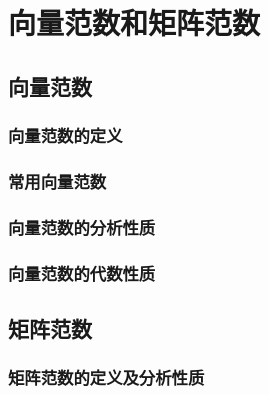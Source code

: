 \chapter{向量范数和矩阵范数}
\label{cha:向量范数和矩阵范数}

\section{向量范数}
\label{sec:向量范数}

\subsection{向量范数的定义}
\label{sub:向量范数的定义}

\begin{definition}[]
\end{definition}

\begin{definition}[]
\end{definition}

\subsection{常用向量范数}
\label{sub:常用向量范数}

\subsection{向量范数的分析性质}
\label{sub:向量范数的分析性质}

\begin{definition}[]
\end{definition}

\begin{definition}[]
\end{definition}

\subsection{向量范数的代数性质}
\label{sub:向量范数的代数性质}

\section{矩阵范数}
\label{sec:矩阵范数}

\subsection{矩阵范数的定义及分析性质}
\label{sub:矩阵范数的定义及分析性质}

